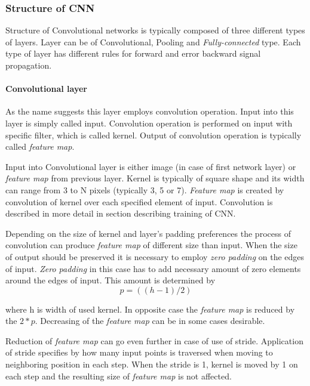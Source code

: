 \documentclass[11pt]{article}
\begin{document}
\subsubsection{Structure of CNN}
\label{sec:orga9d8adc}

Structure of Convolutional networks is typically composed of three different types of layers. Layer can be of Convolutional, Pooling and \emph{Fully-connected} type. Each type of layer has different rules for forward and error backward signal propagation.

\paragraph{Convolutional layer}
\label{sec:orgd55366c}

As the name suggests this layer employs convolution operation. Input into this layer is simply called input. Convolution operation is performed on input with specific filter, which is called kernel. Output of convolution operation is typically called \emph{feature map}.

Input into Convolutional layer is either image (in case of first network layer) or \emph{feature map} from previous layer. Kernel is typically of square shape and its width can range from 3 to N pixels (typically 3, 5 or 7). \emph{Feature map} is created by convolution of kernel over each specified element of input. Convolution is described in more detail in section describing training of CNN.

Depending on the size of kernel and layer's padding preferences the process of convolution can produce \emph{feature map} of different size than input. When the size of output should be preserved it is necessary to employ \emph{zero padding} on the edges of input. \emph{Zero padding} in this case has to add necessary amount of zero elements around the edges of input. This amount is determined by
\begin{equation}
p = ((h - 1) / 2)
\end{equation}

where h is width of used kernel. In opposite case the \emph{feature map} is reduced by the \(2*p\). Decreasing of the \emph{feature map} can be in some cases desirable.

Reduction of \emph{feature map} can go even further in case of use of stride. Application of stride specifies by how many input points is traversed when moving to neighboring position in each step. When the stride is 1, kernel is moved by 1 on each step and the resulting size of \emph{feature map} is not affected.
\end{document}
